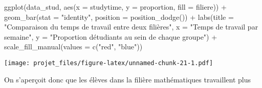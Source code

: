 \documentclass[
]{article}
\newenvironment{Shaded}{\begin{snugshade}}{\end{snugshade}}
\newcommand{\AttributeTok}[1]{\textcolor[rgb]{0.77,0.63,0.00}{#1}}
\newcommand{\DecValTok}[1]{\textcolor[rgb]{0.00,0.00,0.81}{#1}}
\newcommand{\FunctionTok}[1]{\textcolor[rgb]{0.00,0.00,0.00}{#1}}
\newcommand{\NormalTok}[1]{#1}
\newcommand{\OtherTok}[1]{\textcolor[rgb]{0.56,0.35,0.01}{#1}}
\newcommand{\SpecialCharTok}[1]{\textcolor[rgb]{0.00,0.00,0.00}{#1}}
\newcommand{\StringTok}[1]{\textcolor[rgb]{0.31,0.60,0.02}{#1}}
\begin{document}
\begin{Shaded}
\begin{Highlighting}[]
\FunctionTok{ggplot}\NormalTok{(data\_stud, }\FunctionTok{aes}\NormalTok{(}\AttributeTok{x =}\NormalTok{ studytime, }\AttributeTok{y =}\NormalTok{ proportion, }\AttributeTok{fill =}\NormalTok{ filiere)) }\SpecialCharTok{+} 
  \FunctionTok{geom\_bar}\NormalTok{(}\AttributeTok{stat =} \StringTok{"identity"}\NormalTok{, }\AttributeTok{position =} \FunctionTok{position\_dodge}\NormalTok{()) }\SpecialCharTok{+} 
  \FunctionTok{labs}\NormalTok{(}\AttributeTok{title =} \StringTok{"Comparaison du temps de travail entre deux filières"}\NormalTok{, }\AttributeTok{x =} \StringTok{"Temps de travail par semaine"}\NormalTok{, }\AttributeTok{y =} \StringTok{"Proportion d\textquotesingle{}étudiants au sein de chaque groupe"}\NormalTok{) }\SpecialCharTok{+}
  \FunctionTok{scale\_fill\_manual}\NormalTok{(}\AttributeTok{values =} \FunctionTok{c}\NormalTok{(}\StringTok{"red"}\NormalTok{, }\StringTok{"blue"}\NormalTok{))}
\end{Highlighting}
\end{Shaded}

\texttt{[image: projet\_files/figure-latex/unnamed-chunk-21-1.pdf]}

On s'aperçoit donc que les élèves dans la filière mathématiques
travaillent plus

\begin{Shaded}
\end{Shaded}
\end{document}
